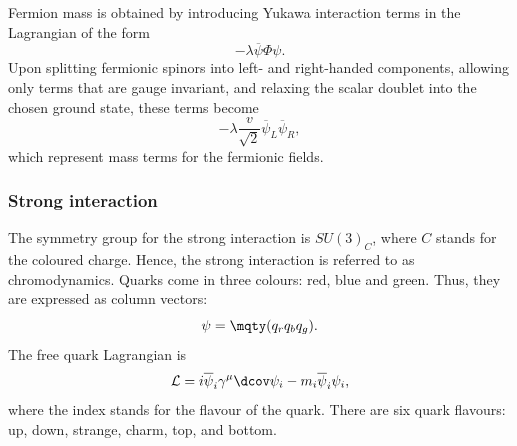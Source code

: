 Fermion mass is obtained by introducing Yukawa interaction terms in the Lagrangian of the form
\begin{equation}
    -\lambda \overline{\psi} \Phi \psi.
\end{equation}
Upon splitting fermionic spinors into left- and right-handed components, allowing only terms that are gauge invariant, and relaxing the scalar doublet into the chosen ground state, these terms become
\begin{equation}
    -\lambda\frac{v}{\sqrt{2}}\overline{\psi}_L\overline{\psi}_R,
\end{equation}
which represent mass terms for the fermionic fields.

\subsubsection*{Strong interaction}
    
    
The symmetry group for the strong interaction is $SU(3)_C$, where $C$ stands for the coloured charge. Hence, the strong interaction is referred to as chromodynamics. Quarks come in three colours: red, blue and green. Thus, they are expressed as column vectors:
$$\psi = \mqty( q_r \\ q_b \\ q_g).$$
The free quark Lagrangian is
\begin{equation}
    \mathcal{L} = i \overline{\psi}_i\gamma^\mu \dcov \psi_i-m_i\overline{\psi}_i\psi_i,
\end{equation}
where the index stands for the flavour of the quark. There are six quark flavours: up, down, strange, charm, top, and bottom.

